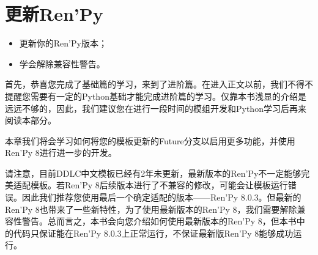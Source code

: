 \chapter{更新Ren'Py}

\begin{ChapterGoals}
    \begin{itemize}
        \item 更新你的Ren'Py版本；
        \item 学会解除兼容性警告。
    \end{itemize}
\end{ChapterGoals}

首先，恭喜您完成了基础篇的学习，来到了进阶篇。在进入正文以前，我们不得不提醒您需要有一定的Python基础才能完成进阶篇的学习。仅靠本书浅显的介绍是远远不够的，因此，我们建议您在进行一段时间的模组开发和Python学习后再来阅读本部分。

本章我们将会学习如何将您的模板更新的Future分支以启用更多功能，并使用Ren'Py 8进行进一步的开发。

\begin{Warning}
    请注意，目前DDLC中文模板已经有2年未更新，最新版本的Ren'Py不一定能够完美适配模板。若Ren'Py 8后续版本进行了不兼容的修改，可能会让模板运行错误。因此我们推荐您使用最后一个确定适配的版本——Ren'Py 8.0.3。但最新的Ren'Py 8也带来了一些新特性，为了使用最新版本的Ren'Py 8，我们需要解除兼容性警告。总而言之，本书会向您介绍如何使用最新版本的Ren'Py 8，但本书中的代码只保证能在Ren'Py 8.0.3上正常运行，不保证最新版Ren'Py 8能够成功运行。
\end{Warning}